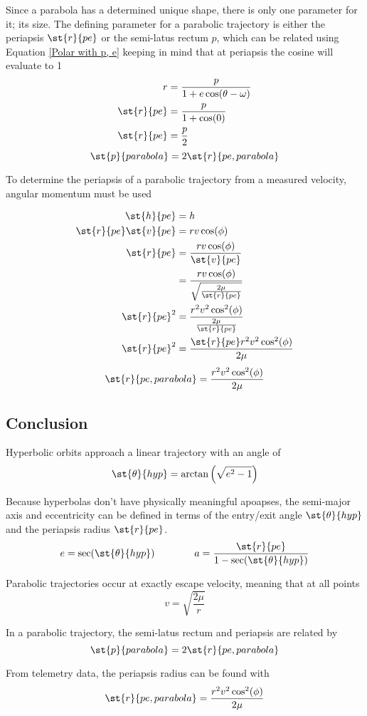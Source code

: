 \documentclass[../basicOrbitalDynamics.tex]{subfiles}
\begin{document}
Since a parabola has a determined unique shape, there is only one parameter for it; its size. The defining parameter for a parabolic trajectory is either the periapsis $\st{r}{pe}$ or the semi-latus rectum $p$, which can be related using Equation \eqref{Polar with p, e} keeping in mind that at periapsis the cosine will evaluate to 1
\begin{align*}
    r           & =\frac{p}{1+e\cos(\theta-\omega)} \\
    \st{r}{pe} & =\frac{p}{1+\cos(0)}              \\
    \st{r}{pe} & =\frac{p}{2}                      \\
\end{align*}
\begin{equation}
    \st{p}{parabola}=2\st{r}{pe,parabola}
\end{equation}

To determine the periapsis of a parabolic trajectory from a measured velocity, angular momentum must be used

\begin{align*}
    \st{h}{pe}            & = h                                                   \\
    \st{r}{pe}\st{v}{pe} & =rv\cos(\phi)                                         \\
    \st{r}{pe}            & =\frac{rv\cos(\phi)}{\st{v}{pe}}                     \\
                           & =\frac{rv\cos(\phi)}{\sqrt{\frac{2\mu}{\st{r}{pe}}}} \\
    \st{r}{pe}^2          & =\frac{r^2v^2\cos^2(\phi)}{\frac{2\mu}{\st{r}{pe}}}  \\
    \st{r}{pe}^2          & =\frac{\st{r}{pe}r^2v^2\cos^2(\phi)}{2\mu}           \\
\end{align*}
\begin{equation}\label{Periapsis Radius Parabola}
    \st{r}{pe,parabola}=\frac{r^2v^2\cos^2(\phi)}{2\mu}
\end{equation}

\bigskip\bigskip
\subsection{Conclusion}

\bigskip
Hyperbolic orbits approach a linear trajectory with an angle of
$$\st{\theta}{hyp}=\arctan\left(\sqrt{e^2-1}\right)$$

\bigskip
Because hyperbolas don't have physically meaningful apoapses, the semi-major axis and eccentricity can be defined in terms of the entry/exit angle $\st{\theta}{hyp}$ and the periapsis radius $\st{r}{pe}$.
$$e=\sec(\st{\theta}{hyp})\qquad\qquad a=\frac{{\st{r}{pe}}}{1-\sec(\st{\theta}{hyp})}$$

\bigskip
Parabolic trajectories occur at exactly escape velocity, meaning that at all points
$$v=\sqrt{\frac{2\mu}{r}}$$

\bigskip
In a parabolic trajectory, the semi-latus rectum and periapsis are related by
$$\st{p}{parabola}=2\st{r}{pe,parabola}$$

\bigskip
From telemetry data, the periapsis radius can be found with
$$\st{r}{pe,parabola}=\frac{r^2v^2\cos^2(\phi)}{2\mu}$$
\end{document}
